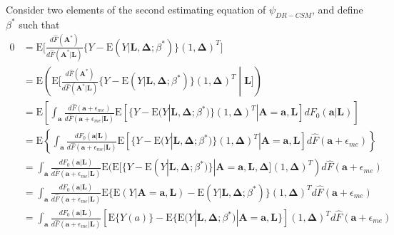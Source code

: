 \documentclass[12pt]{article}
\begin{document}
Consider two elements of the second estimating equation of $\psi_{DR-CSM}$, and define $\beta^{*}$ such that
\begin{align*}
0 &= \text{E} \bigg[\frac{d\hat{F}(\bm{A}^{*})}{d\hat{F}(\bm{A}^{*} | \bm{L})} \{ Y - \text{E}(Y | \bm{L}, \bm{\Delta}; \beta^{*})\} (1, \bm{\Delta})^{T} \bigg] \\
&= \text{E} \left( \text{E} \bigg[\frac{d\hat{F}(\bm{A}^{*})}{d\hat{F}(\bm{A}^{*} | \bm{L})} \{ Y - \text{E}(Y | \bm{L}, \bm{\Delta}; \beta^{*}) \} (1, \bm{\Delta})^{T} \middle| \bm{L} \bigg] \right) \\
&= \text{E} \left [ \int_{\bm{a}} \frac{d\hat{F}(\bm{a} + \epsilon_{me})}{d\hat{F}(\bm{a} + \epsilon_{me} | \bm{L})} \text{E} [ \{ Y - \text{E}(Y | \bm{L}, \bm{\Delta}; \beta^{*}) \} (1, \bm{\Delta})^{T} | \bm{A} = \bm{a}, \bm{L} ] dF_{0}(\bm{a} | \bm{L}) \right ] \\
&= \text{E} \left \{ \int_{\bm{a}} \frac{dF_{0}(\bm{a} | \bm{L})}{d\hat{F}(\bm{a} + \epsilon_{me} | \bm{L})} \text{E} [ \{ Y - \text{E}(Y | \bm{L}, \bm{\Delta}; \beta^{*}) \} (1, \bm{\Delta})^{T} | \bm{A} = \bm{a}, \bm{L} ] d\hat{F}(\bm{a} + \epsilon_{me}) \right \} \\
&= \int_{\bm{a}} \frac{dF_{0}(\bm{a} | \bm{L})}{d\hat{F}(\bm{a} + \epsilon_{me} | \bm{L})} \text{E} ( \text{E} [ \{ Y - \text{E}(Y | \bm{L}, \bm{\Delta}; \beta^{*}) \} | \bm{A} = \bm{a}, \bm{L}, \bm{\Delta} ] (1, \bm{\Delta})^{T} ) d\hat{F}(\bm{a} + \epsilon_{me})  \\
&= \int_{\bm{a}} \frac{dF_{0}(\bm{a} | \bm{L})}{d\hat{F}(\bm{a} + \epsilon_{me} | \bm{L})} \text{E} \{ \text{E} (Y | \bm{A} = \bm{a}, \bm{L}) - \text{E}(Y | \bm{L}, \bm{\Delta}; \beta^{*}) \} (1, \bm{\Delta})^{T} d\hat{F}(\bm{a} + \epsilon_{me})  \\
&= \int_{\bm{a}} \frac{dF_{0}(\bm{a} | \bm{L})}{d\hat{F}(\bm{a} + \epsilon_{me} | \bm{L})} [ \text{E} \{ Y(a) \} - \text{E} \{ \text{E}(Y | \bm{L}, \bm{\Delta}; \beta^{*}) | \bm{A} = \bm{a}, \bm{L} \} ] (1, \bm{\Delta})^{T} d\hat{F}(\bm{a} + \epsilon_{me})
\end{align*}
\end{document}
